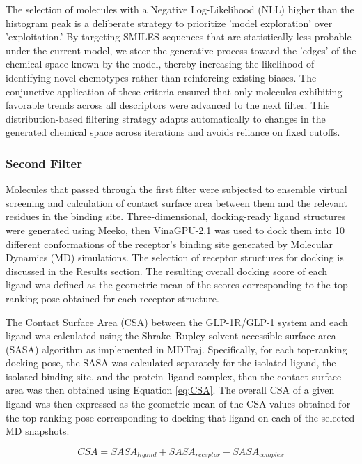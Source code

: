 \documentclass[letterpaper]{article}
\begin{document}
The selection of molecules with a Negative Log-Likelihood (NLL) higher than the histogram peak is a deliberate strategy to prioritize 'model exploration' over 'exploitation.' By targeting SMILES sequences that are statistically less probable under the current model, we steer the generative process toward the 'edges' of the chemical space known by the model, thereby increasing the likelihood of identifying novel chemotypes rather than reinforcing existing biases. The conjunctive application of these criteria ensured that only molecules exhibiting favorable trends across all descriptors were advanced to the next filter. This distribution-based filtering strategy adapts automatically to changes in the generated chemical space across iterations and avoids reliance on fixed cutoffs.

\subsubsection{Second Filter}\label{section:second_filter}
Molecules that passed through the first filter were subjected to ensemble virtual screening and calculation of contact surface area between them and the relevant residues in the binding site. 
Three-dimensional, docking-ready ligand structures were generated using Meeko\cite{Santos-Martins2025Meeko:Beyond}, then VinaGPU-2.1\cite{Ding2023Vina-GPUUnits,Tang2024Vina-GPUDerivatives} was used to dock them into 10 different conformations of the receptor's binding site generated by Molecular Dynamics (MD) simulations. The selection of receptor structures for docking is discussed in the Results section. The resulting overall docking score of each ligand was defined as the geometric mean of the scores corresponding to the top-ranking pose obtained for each receptor structure.

The Contact Surface Area (CSA) between the GLP-1R/GLP-1 system and each ligand was calculated using the Shrake–Rupley solvent-accessible surface area (SASA) algorithm as implemented in MDTraj\cite{McGibbon2015MDTraj:Trajectories}. Specifically, for each top-ranking docking pose, the SASA was calculated separately for the isolated ligand, the isolated binding site, and the protein–ligand complex, then the contact surface area was then obtained using Equation \ref{eq:CSA}. The overall CSA of a given ligand was then expressed as the geometric mean of the CSA values obtained for the top ranking pose corresponding to docking that ligand on each of the selected MD snapshots.

\begin{equation}
\label{eq:CSA}
    CSA = SASA_{ligand}+SASA_{receptor}-SASA_{complex}
\end{equation}
\end{document}

